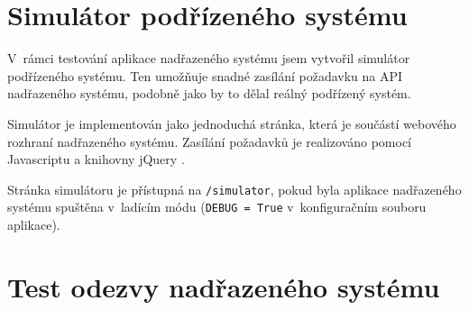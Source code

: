 \section{Simulátor podřízeného systému}

V~rámci testování aplikace nadřazeného systému jsem vytvořil simulátor podřízeného systému. Ten umožňuje snadné zasílání požadavku na API nadřazeného systému, podobně jako by to dělal reálný podřízený systém.

Simulátor je implementován jako jednoduchá stránka, která je součástí webového rozhraní nadřazeného systému. Zasílání požadavků je realizováno pomocí Javascriptu a knihovny jQuery \cite{jquery_about}. 

Stránka simulátoru je přístupná na \texttt{/simulator}, pokud byla aplikace nadřazeného systému spuštěna v~ladícím módu (\texttt{DEBUG = True} v~konfiguračním souboru aplikace).

\section{Test odezvy nadřazeného systému}







